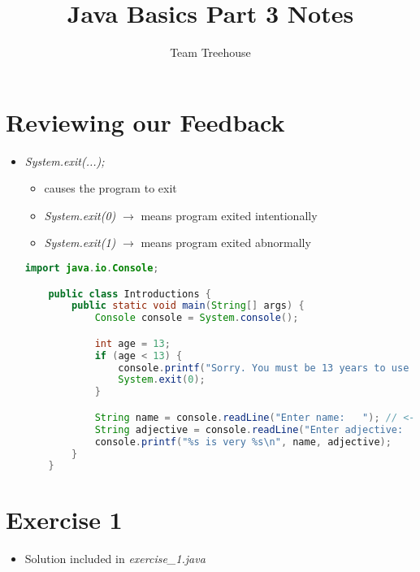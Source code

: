 \documentclass[12pt]{article}
\begin{document}
\title{Java Basics Part 3 Notes}
\author{Team Treehouse}
\maketitle

\section{Reviewing our Feedback}

\bigskip

\begin{itemize}
    \item  \textit{System.exit(...);}
    \begin{itemize}
        \item causes the program to exit
        \item \textit{System.exit(0)} $\to$ means program exited intentionally
        \item \textit{System.exit(1)} $\to$ means program exited abnormally
    \end{itemize}

    \bigskip

    \begin{lstlisting}[language=Java]
    import java.io.Console;

    public class Introductions {
        public static void main(String[] args) {
            Console console = System.console();

            int age = 13;
            if (age < 13) {
                console.printf("Sorry. You must be 13 years to use this program");
                System.exit(0);
            }

            String name = console.readLine("Enter name:   "); // <- Let's write 'Moe' here
            String adjective = console.readLine("Enter adjective:   "); // <- and 'glad to be with his love' here :)
            console.printf("%s is very %s\n", name, adjective);
        }
    }
    \end{lstlisting}

\end{itemize}


\section{Exercise 1}

\bigskip

\begin{itemize}
    \item Solution included in \textit{exercise\_1.java}
\end{itemize}
\end{document}

